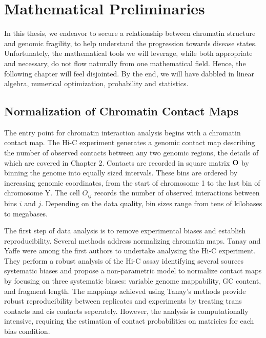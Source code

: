
\chapter{Mathematical Preliminaries}

In this thesis, we endeavor to secure a relationship between chromatin structure and genomic fragility, to help understand the
progression towards disease states.  Unfortunately, the mathematical tools we will leverage, while both appropriate and necessary,
do not flow naturally from one mathematical field.  Hence, the following chapter will feel disjointed.  By the end, we will have
dabbled in linear algebra, numerical optimization, probability and statistics.

\section*{Normalization of Chromatin Contact Maps}

The entry point for chromatin interaction analysis begins with a chromatin \gls{contact map}.  The Hi-C experiment generates a
genomic contact map describing the number of observed contacts between any two genomic regions, the details of which are covered
in Chapter 2.  Contacts are recorded in square matrix $\mathbf{O}$ by binning the genome into equally sized intervals.  These bins
are ordered by increasing genomic coordinates, from the start of chromosome 1 to the last bin of chromosome Y.  The cell $O_{ij}$
records the number of observed interactions between bins $i$ and $j$.  Depending on the data quality, bin sizes range from tens of
kilobases to megabases.

The first step of data analysis is to remove experimental biases and establish reproducibility.  Several methods address
normalizing chromatin maps.  Tanay and Yaffe were among the first authors to undertake analysing the Hi-C experiment\cite{yaffe2011}.
They perform a robust analysis of the Hi-C assay identifying several sources systematic biases and propose a non-parametric model
to normalize contact maps by focusing on three systematic biases: variable genome mappability, \gls{GC} content, and fragment length.
The mappings achieved using Tanay's methods provide robust reproducibility between replicates and experiments by treating
\gls{trans contacts} and \gls{cis contacts} seperately\cite{yaffe2011}.  However, the analysis is computationally intensive, requiring
the estimation of contact probabilities on matricies for each bias condition.

